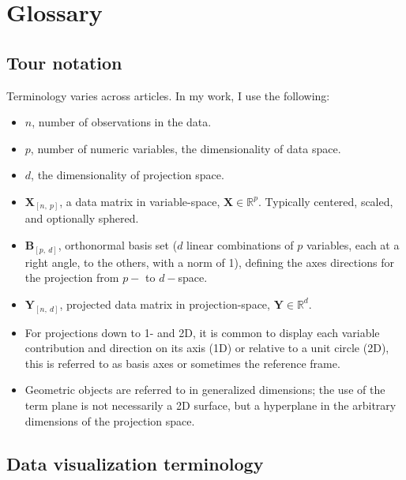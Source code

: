 \documentclass{monashthesis}
\begin{document}
\chapter{Glossary}\label{ch:glossary}

\section{Tour notation}\label{sec:tour_notation}

Terminology varies across articles. In my work, I use the following:

\begin{itemize}
\tightlist
\item
  \(n\), number of observations in the data.
\item
  \(p\), number of numeric variables, the dimensionality of data space.
\item
  \(d\), the dimensionality of projection space.
\item
  \(\textbf{X}_{[n,~p]}\), a data matrix in variable-space,
  \(\textbf{X} \in \mathbb{R}^{p}\). Typically centered, scaled, and
  optionally sphered.
\item
  \(\textbf{B}_{[p,~d]}\), orthonormal basis set (\(d\) linear
  combinations of \(p\) variables, each at a right angle, to the others,
  with a norm of 1), defining the axes directions for the projection
  from \(p-\) to \(d-\)space.
\item
  \(\textbf{Y}_{[n,~d]}\), projected data matrix in projection-space,
  \(\textbf{Y} \in \mathbb{R}^{d}\).
\item
  For projections down to 1- and 2D, it is common to display each
  variable contribution and direction on its axis (1D) or relative to a
  unit circle (2D), this is referred to as basis axes or sometimes the
  reference frame.
\item
  Geometric objects are referred to in generalized dimensions; the use
  of the term plane is not necessarily a 2D surface, but a hyperplane in
  the arbitrary dimensions of the projection space.
\end{itemize}

\section{Data visualization terminology}\label{sec:3d-terminology}
\end{document}
